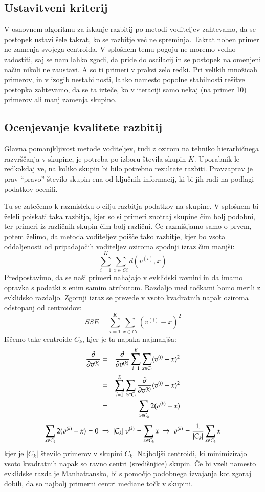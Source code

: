 \subsection{Ustavitveni kriterij}

V osnovnem algoritmu za iskanje razbitij po metodi voditeljev
zahtevamo, da se postopek ustavi šele takrat, ko se razbitje več ne
spreminja. Takrat noben primer ne zamenja svojega centroida. V
splošnem temu pogoju ne moremo vedno zadostiti, saj se nam lahko
zgodi, da pride do oscilacij in se postopek na omenjeni način nikoli
ne zaustavi. A so ti primeri v praksi zelo redki. Pri velikih množicah
primerov, in v izogib nestabilnosti, lahko namesto popolne stabilnosti
rešitve postopka zahtevamo, da se ta izteče, ko v iteraciji samo nekaj
(na primer 10) primerov ali manj zamenja skupino.

\subsection{Ocenjevanje kvalitete razbitij}

Glavna pomanjkljivost metode voditeljev, tudi z ozirom na tehniko
hierarhičnega razvrščanja v skupine, je potreba po izboru števila
skupin $K$. Uporabnik le redkokdaj ve, na koliko skupin bi bilo
potrebno rezultate razbiti. Pravzaprav je prav ``pravo'' število
skupin ena od ključnih informacij, ki bi jih radi na podlagi podatkov
ocenili.

Tu se zatečemo k razmisleku o cilju razbitja podatkov na skupine. V
splošnem bi želeli poiskati taka razbitja, kjer so si primeri znotraj
skupine čim bolj podobni, ter primeri iz različnih skupin čim bolj
različni. Če razmišljamo samo o prvem, potem želimo, da metoda
voditeljev poišče tako razbitje, kjer bo vsota oddaljenosti od
pripadajočih voditeljev oziroma spodnji izraz čim manjši:
%
$$ \sum_{i=1}^K \sum_{x\in Ci} d(v^{(i)}, x) $$
%
Predpostavimo, da se naši primeri nahajajo v evklidski ravnini in da imamo opravka s podatki z enim samim atributom. Razdaljo med točkami bomo merili z evklidsko razdaljo. Zgornji izraz se prevede v vsoto kvadratnih napak  oziroma odstopanj od centroidov:
%
$$SSE = \sum_{i=1}^K \sum_{x\in Ci}(v^{(i)}-x)^2$$
%
Iščemo take centroide $C_k$, kjer je ta napaka najmanjša:
\begin{eqnarray}
\frac{\partial}{\partial v^{(k)}} & = & \frac{\partial}{\partial v^{(k)}}\sum_{i=1}^K\sum_{x\in C_i}(v^{(i)}-x)^2  \\
& = & \sum_{i=1}^K\sum_{x\in C_i} \frac{\partial}{\partial v^{(k)}}(v^{(i)}-x)^2 \\
& = & \sum_{x\in C_k} 2 (v^{(k)}-x)
\end{eqnarray}
%
\begin{equation}
\sum_{x\in C_k} 2 (v^{(k)}-x) = 0 \ \Rightarrow \ |C_k|\ v^{(k)} = \sum_{x\in C_k}
  x \ \Rightarrow \ v^{(k)} = {1 \over |C_k|} \sum_{x\in C_k}x
\end{equation}
%
kjer je $|C_k|$ število primerov v skupini $C_k$. Najboljši centroidi,
ki minimizirajo vsoto kvadratnih napak so ravno centri (središnjice)
skupin. Če bi vzeli namesto evklidske razdalje Manhattansko, bi s
pomočjo podobnega izvajanja kot zgoraj dobili, da so najbolj primerni
centri mediane točk v skupini.

